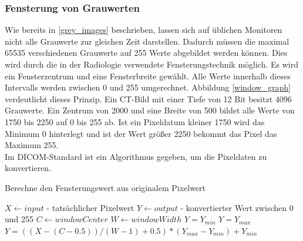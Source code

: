\FloatBarrier
\subsubsection{Fensterung von Grauwerten} \label{windowing}

Wie bereits in \ref{grey_images} beschrieben, lassen sich auf üblichen Monitoren nicht alle Grauwerte zur gleichen Zeit darstellen. Dadurch müssen die maximal 65535 verschiedenen Grauwerte auf 255 Werte abgebildet werden können. Dies wird durch die in der Radiologie verwendete Fensterungstechnik möglich\cite[Kapitel 8, Seite 249]{handels:mbv}. Es wird ein Fensterzentrum und eine Fensterbreite gewählt. Alle Werte innerhalb dieses Intervalls werden zwischen 0 und 255 umgerechnet. Abbildung \ref{window_graph} verdeutlicht dieses Prinzip. Ein CT-Bild mit einer Tiefe von 12 Bit besitzt 4096 Grauwerte. Ein Zentrum von 2000 und eine Breite von 500 bildet alle Werte von 1750 bis 2250 auf 0 bis 255 ab. Ist ein Pixeldatum kleiner 1750 wird das Minimum 0 hinterlegt und ist der Wert größer 2250 bekommt das Pixel das Maximum 255.\\
Im DICOM-Standard ist ein Algorithmus gegeben, um die Pixeldaten zu konvertieren\cite[C.11.2.1.2]{dicom:iod}.

\begin{algorithm}
\caption{Berechne den Fensterungswert aus originalem Pixelwert}
\begin{algorithmic}[1] 
\STATE $X \leftarrow input$ - tatsächlicher Pixelwert
\STATE $Y \leftarrow output$ - konvertierter Wert zwischen 0 und 255
\STATE $C \leftarrow windowCenter$
\STATE $W \leftarrow windowWidth$
	\STATE  $Y = Y_{min}$
	\STATE $Y = Y_{max}$
\ELSE
	\STATE $Y = ((X-(C-0.5)) / (W-1)+0.5)*(Y_{max}-Y_{min})+Y_{min}$
\ENDIF
\end{algorithmic}
\label{windowing_algo}
\end{algorithm}


